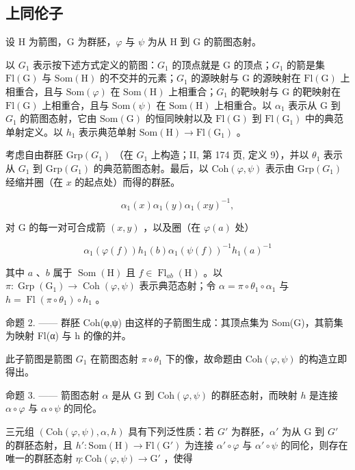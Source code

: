 \subsection{上同伦子}

设 H 为箭图，G 为群胚，\(\varphi\) 与 \(\psi\) 为从 H 到 G 的箭图态射。

以 \(G_{1}\) 表示按下述方式定义的箭图：\(G_{1}\) 的顶点就是 G 的顶点；\(G_{1}\) 的箭是集 \(\mathrm{Fl(G)}\) 与 \(\mathrm{Som(H)}\) 的不交并的元素；\(G_{1}\) 的源映射与 G 的源映射在 \(\mathrm{Fl(G)}\) 上相重合，且与 \(\mathrm{Som}(\varphi)\) 在 \(\mathrm{Som(H)}\) 上相重合；\(G_{1}\) 的靶映射与 G 的靶映射在 \(\mathrm{Fl(G)}\) 上相重合，且与 \(\mathrm{Som}(\psi)\) 在 \(\mathrm{Som(H)}\) 上相重合。以 \(\alpha_{1}\) 表示从 G 到 \(G_{1}\) 的箭图态射，它由 \(\mathrm{Som(G)}\) 的恒同映射以及 \(\mathrm{Fl(G)}\) 到 \(\mathrm{Fl(G_{1})}\) 中的典范单射定义。以 \(h_{1}\) 表示典范单射 \(\mathrm{Som(H)} \to \mathrm{Fl(G_{1})}\) 。

考虑自由群胚 \(\mathrm{Grp}(G_{1})\) （在 \(G_{1}\) 上构造；II, 第 174 页, 定义 9），并以 \(\theta_{1}\) 表示从 \(G_{1}\) 到 \(\mathrm{Grp}(G_{1})\) 的典范箭图态射。最后，以 \(\mathrm{Coh}(\varphi,\psi)\) 表示由 \(\mathrm{Grp}(G_{1})\) 经缩并圈（在 \(x\) 的起点处）而得的群胚。

\[
\alpha_ {1} (x) \alpha_ {1} (y) \alpha_ {1} (x y) ^ {- 1},\tag{1}
\]

对 G 的每一对可合成箭 \((x,y)\) ，以及圈（在 \(\varphi(a)\) 处）

\[
\alpha_ {1} (\varphi (f)) h _ {1} (b) \alpha_ {1} (\psi (f)) ^ {- 1} h _ {1} (a) ^ {- 1}\tag{2}
\]

其中 \(a\) 、\(b\) 属于 \(\operatorname{Som}(\mathrm{H})\) 且 \(f \in \operatorname{Fl}_{ab}(\mathrm{H})\) 。以 \(\pi: \operatorname{Grp}(\mathrm{G}_1) \to \operatorname{Coh}(\varphi, \psi)\) 表示典范态射；令 \(\alpha = \pi \circ \theta_1 \circ \alpha_1\) 与 \(h = \operatorname{Fl}(\pi \circ \theta_1) \circ h_1\) 。

命题 2. —— 群胚 Coh(φ,ψ) 由这样的子箭图生成：其顶点集为 Som(G)，其箭集为映射 Fl(α) 与 h 的像的并。

此子箭图是箭图 \(G_{1}\) 在箭图态射 \(\pi \circ \theta_{1}\) 下的像，故命题由 \(\mathrm{Coh}(\varphi, \psi)\) 的构造立即得出。

命题 3. —— 箭图态射 \(\alpha\) 是从 G 到 \(\mathrm{Coh}(\varphi, \psi)\) 的群胚态射，而映射 \(h\) 是连接 \(\alpha \circ \varphi\) 与 \(\alpha \circ \psi\) 的同伦。

三元组 \((\mathrm{Coh}(\varphi,\psi),\alpha,h)\) 具有下列泛性质：若 \(G'\) 为群胚，\(\alpha'\) 为从 G 到 \(G'\) 的群胚态射，且 \(h'\colon\mathrm{Som}(\mathrm{H})\to\mathrm{Fl}(\mathrm{G}')\) 为连接 \(\alpha'\circ\varphi\) 与 \(\alpha'\circ\psi\) 的同伦，则存在唯一的群胚态射 \(\eta\colon\mathrm{Coh}(\varphi,\psi)\to\mathrm{G}'\) ，使得

